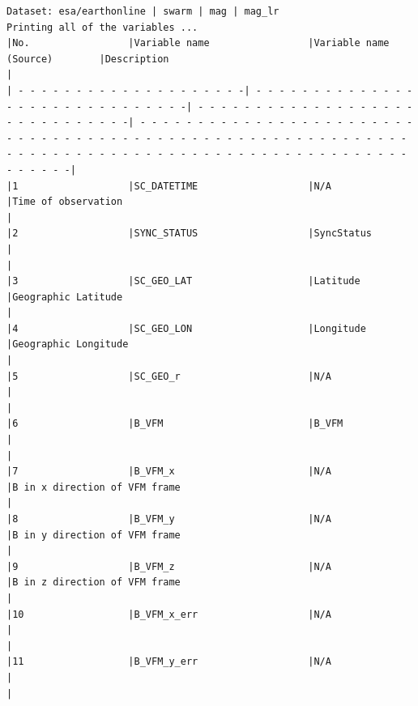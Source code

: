 \begin{verbatim}
Dataset: esa/earthonline | swarm | mag | mag_lr
Printing all of the variables ...
|No.                 |Variable name                 |Variable name (Source)        |Description                                                                                         |
| - - - - - - - - - - - - - - - - - - - -| - - - - - - - - - - - - - - - - - - - - - - - - - - - - - -| - - - - - - - - - - - - - - - - - - - - - - - - - - - - - -| - - - - - - - - - - - - - - - - - - - - - - - - - - - - - - - - - - - - - - - - - - - - - - - - - - - - - - - - - - - - - - - - - - - - - - - - - - - - - - - - - - - - - - - - - - - - - - - - - - - -|
|1                   |SC_DATETIME                   |N/A                           |Time of observation                                                                                 |
|2                   |SYNC_STATUS                   |SyncStatus                    |                                                                                                    |
|3                   |SC_GEO_LAT                    |Latitude                      |Geographic Latitude                                                                                 |
|4                   |SC_GEO_LON                    |Longitude                     |Geographic Longitude                                                                                |
|5                   |SC_GEO_r                      |N/A                           |                                                                                                    |
|6                   |B_VFM                         |B_VFM                         |                                                                                                    |
|7                   |B_VFM_x                       |N/A                           |B in x direction of VFM frame                                                                       |
|8                   |B_VFM_y                       |N/A                           |B in y direction of VFM frame                                                                       |
|9                   |B_VFM_z                       |N/A                           |B in z direction of VFM frame                                                                       |
|10                  |B_VFM_x_err                   |N/A                           |                                                                                                    |
|11                  |B_VFM_y_err                   |N/A                           |                                                                                                    |

\end{verbatim}
